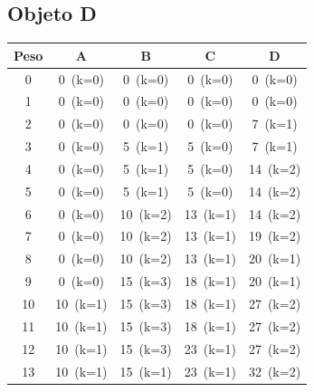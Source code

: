 \documentclass[12pt]{article}
\begin{document}
\begin{landscape}
\subsection*{Objeto D}
\begin{longtable}{ccccc}
\toprule
Peso & A & B & C & D \\
\midrule
0 & \cellcolor{red!20}0~(k=0) & \cellcolor{red!20}0~(k=0) & \cellcolor{red!20}0~(k=0) & \cellcolor{red!20}0~(k=0) \\
1 & \cellcolor{red!20}0~(k=0) & \cellcolor{red!20}0~(k=0) & \cellcolor{red!20}0~(k=0) & \cellcolor{red!20}0~(k=0) \\
2 & \cellcolor{red!20}0~(k=0) & \cellcolor{red!20}0~(k=0) & \cellcolor{red!20}0~(k=0) & \cellcolor{green!40}7~(k=1) \\
3 & \cellcolor{red!20}0~(k=0) & \cellcolor{green!40}5~(k=1) & \cellcolor{red!20}5~(k=0) & \cellcolor{green!40}7~(k=1) \\
4 & \cellcolor{red!20}0~(k=0) & \cellcolor{green!40}5~(k=1) & \cellcolor{red!20}5~(k=0) & \cellcolor{green!40}14~(k=2) \\
5 & \cellcolor{red!20}0~(k=0) & \cellcolor{green!40}5~(k=1) & \cellcolor{red!20}5~(k=0) & \cellcolor{green!40}14~(k=2) \\
6 & \cellcolor{red!20}0~(k=0) & \cellcolor{green!40}10~(k=2) & \cellcolor{green!40}13~(k=1) & \cellcolor{green!40}14~(k=2) \\
7 & \cellcolor{red!20}0~(k=0) & \cellcolor{green!40}10~(k=2) & \cellcolor{green!40}13~(k=1) & \cellcolor{green!40}19~(k=2) \\
8 & \cellcolor{red!20}0~(k=0) & \cellcolor{green!40}10~(k=2) & \cellcolor{green!40}13~(k=1) & \cellcolor{green!40}20~(k=1) \\
9 & \cellcolor{red!20}0~(k=0) & \cellcolor{green!40}15~(k=3) & \cellcolor{green!40}18~(k=1) & \cellcolor{green!40}20~(k=1) \\
10 & \cellcolor{green!40}10~(k=1) & \cellcolor{green!40}15~(k=3) & \cellcolor{green!40}18~(k=1) & \cellcolor{green!40}27~(k=2) \\
11 & \cellcolor{green!40}10~(k=1) & \cellcolor{green!40}15~(k=3) & \cellcolor{green!40}18~(k=1) & \cellcolor{green!40}27~(k=2) \\
12 & \cellcolor{green!40}10~(k=1) & \cellcolor{green!40}15~(k=3) & \cellcolor{green!40}23~(k=1) & \cellcolor{green!40}27~(k=2) \\
13 & \cellcolor{green!40}10~(k=1) & \cellcolor{yellow!50}15~(k=1) & \cellcolor{green!40}23~(k=1) & \cellcolor{green!40}32~(k=2) \\

\end{longtable}
\end{landscape}
\end{document}
